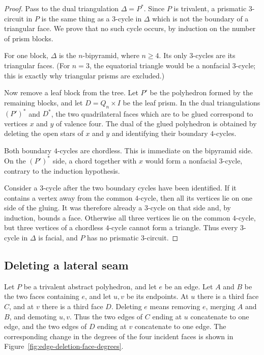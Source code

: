 \documentclass[12pt,a4paper]{article}
\theoremstyle{definition}
\begin{document}
\begin{proof}
Pass to the dual triangulation \(\Delta=P^*\).  Since \(P\) is trivalent, a
prismatic \(3\)-circuit in \(P\) is the same thing as a \(3\)-cycle in
\(\Delta\) which is not the boundary of a triangular face.  We prove that no
such cycle occurs, by induction on the number of prism blocks.

For one block, \(\Delta\) is the \(n\)-bipyramid, where \(n\ge4\).  Its only
\(3\)-cycles are its triangular faces.  (For \(n=3\), the equatorial
triangle would be a nonfacial \(3\)-cycle; this is exactly why triangular
prisms are excluded.)

Now remove a leaf block from the tree.  Let \(P'\) be the polyhedron formed
by the remaining blocks, and let \(D=Q_n\times I\) be the leaf prism.  In
the dual triangulations \((P')^*\) and \(D^*\), the two quadrilateral faces
which are to be glued correspond to vertices \(x\) and \(y\) of valence
four.  The dual of the glued polyhedron is obtained by deleting the open
stars of \(x\) and \(y\) and identifying their boundary \(4\)-cycles.

Both boundary \(4\)-cycles are chordless.  This is immediate on the
bipyramid side.  On the \((P')^*\) side, a chord together with \(x\) would
form a nonfacial \(3\)-cycle, contrary to the induction hypothesis.

Consider a \(3\)-cycle after the two boundary cycles have been identified.
If it contains a vertex away from the common \(4\)-cycle, then all its
vertices lie on one side of the gluing.  It was therefore already a
\(3\)-cycle on that side and, by induction, bounds a face.  Otherwise all
three vertices lie on the common \(4\)-cycle, but three vertices of a
chordless \(4\)-cycle cannot form a triangle.  Thus every \(3\)-cycle in
\(\Delta\) is facial, and \(P\) has no prismatic \(3\)-circuit.
\end{proof}

\subsection{Deleting a lateral seam}

Let \(P\) be a trivalent abstract polyhedron, and let \(e\) be an edge. Let
\(A\) and \(B\) be the two faces containing \(e\), and let \(u,v\) be its
endpoints. At \(u\) there is a third face \(C\), and at \(v\) there is a third
face \(D\). Deleting \(e\) means removing \(e\), merging \(A\) and \(B\), and
demoting \(u,v\). Thus the two edges of \(C\) ending at \(u\) concatenate to
one edge, and the two edges of \(D\) ending at \(v\) concatenate to one edge.
The corresponding change in the degrees of the four incident faces is shown
in Figure~\ref{fig:edge-deletion-face-degrees}.
\end{document}
